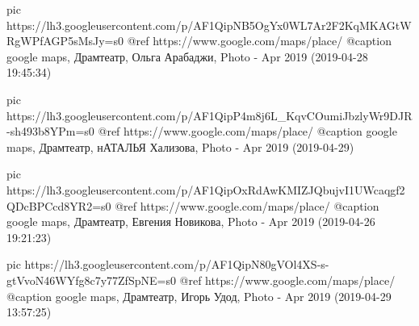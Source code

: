      pic https://lh3.googleusercontent.com/p/AF1QipNB5OgYx0WL7Ar2F2KqMKAGtWRgWPfAGP5sMsJy=s0
     @ref https://www.google.com/maps/place/%
     @caption google maps, Драмтеатр, Ольга Арабаджи, Photo - Apr 2019 (2019-04-28 19:45:34)

     pic https://lh3.googleusercontent.com/p/AF1QipP4m8j6L_KqvCOumiJbzlyWr9DJR-sh493b8YPm=s0
     @ref https://www.google.com/maps/place/%
     @caption google maps, Драмтеатр, нАТАЛЬЯ Хализова, Photo - Apr 2019 (2019-04-29)

     pic https://lh3.googleusercontent.com/p/AF1QipOxRdAwKMIZJQbujvI1UWcaqgf2QDcBPCcd8YR2=s0
     @ref https://www.google.com/maps/place/%
     @caption google maps, Драмтеатр, Евгения Новикова, Photo - Apr 2019 (2019-04-26 19:21:23)

     pic https://lh3.googleusercontent.com/p/AF1QipN80gVOl4XS-s-gtVvoN46WYfg8c7y77ZfSpNE=s0
     @ref https://www.google.com/maps/place/%
     @caption google maps, Драмтеатр, Игорь Удод, Photo - Apr 2019 (2019-04-29 13:57:25)


